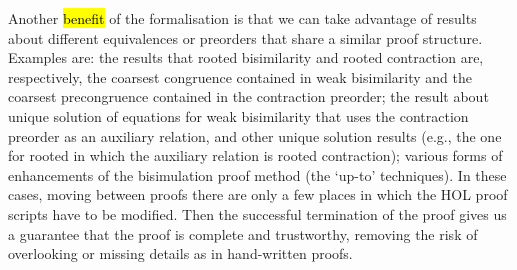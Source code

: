 
Another \hl{benefit} of the formalisation is 
that we can take advantage of results about different 
equivalences or preorders that share a similar proof structure. 
Examples are: the results that rooted bisimilarity and rooted contraction are,
respectively, the coarsest congruence contained in weak bisimilarity 
and the coarsest precongruence contained in the contraction  preorder; 
the result about unique solution of equations for weak bisimilarity that uses the
contraction preorder as an auxiliary relation, and other unique solution results (e.g., 
the one for rooted in which
the auxiliary relation is rooted contraction); various forms of enhancements of the bisimulation
proof method (the `up-to' techniques).
In these cases,  moving between proofs there are only a few places in
which the HOL proof scripts have to be modified.
Then the successful termination of the proof gives us a guarantee that the proof is
complete and trustworthy, removing the risk 
of overlooking or missing details as in hand-written proofs.



